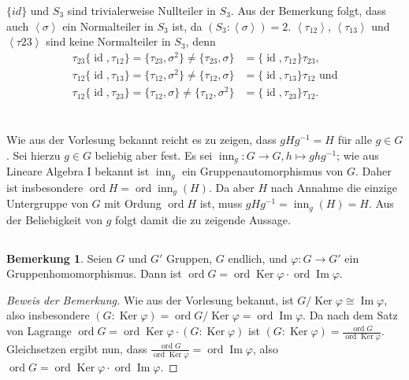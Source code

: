 \documentclass[a4paper,10pt]{article}
\theoremstyle{definition}
\newtheorem*{bem}{Bemerkung}
\newcommand{\id}{\operatorname{id}}
\newcommand{\ord}{\operatorname{ord}}
\newcommand{\inn}{\operatorname{inn}}
\newcommand{\Img}{\operatorname{Im}}
\newcommand{\Ker}{\operatorname{Ker}}
\newcommand{\gen}[1]{\left\langle#1\right\rangle}
\begin{document}
$\{id\}$ und $S_3$ sind trivialerweise Nullteiler in $S_3$. Aus der Bemerkung folgt, dass auch $\gen{\sigma}$ ein Normalteiler in $S_3$ ist, da $(S_3 : \gen{\sigma}) = 2$. $\gen{\tau_{12}}$, $\gen{\tau_{13}}$ und $\gen{\tau{23}}$ sind keine Normalteiler in $S_3$, denn
\begin{align*}
 \tau_{23} \{ \id, \tau_{12}\}
 = \{ \tau_{23}, \sigma^2 \}
 \neq \{ \tau_{23}, \sigma \}
 &= \{\id, \tau_{12}\} \tau_{23},\\
 \tau_{12} \{ \id, \tau_{13}\}
 = \{ \tau_{12}, \sigma^2 \}
 \neq \{ \tau_{12}, \sigma \}
 &= \{ \id, \tau_{13} \} \tau_{12} \text{ und}\\
 \tau_{12} \{ \id, \tau_{23} \}
 = \{ \tau_{12}, \sigma \}
 \neq  \{ \tau_{12}, \sigma^2 \}
 &= \{ \id, \tau_{23} \} \tau_{12}.
\end{align*}





\section{}







\section{}


\subsection{}
Wie aus der Vorlesung bekannt reicht es zu zeigen, dass $gHg^{-1} = H$ für alle $g \in G$. Sei hierzu $g \in G$ beliebig aber fest. Es sei $\inn_g : G \rightarrow G, h \mapsto ghg^{-1}$; wie aus Lineare Algebra I bekannt ist $\inn_g$ ein Gruppenautomorphismus von $G$. Daher ist insbesondere $\ord H = \ord \inn_g(H)$. Da aber $H$ nach Annahme die einzige Untergruppe von $G$ mit Ordung $\ord H$ ist, muss $gHg^{-1} = \inn_g(H) = H$. Aus der Beliebigkeit von $g$ folgt damit die zu zeigende Aussage.


\subsection{}
\begin{bem}
 Seien $G$ und $G'$ Gruppen, $G$ endlich, und $\varphi : G \rightarrow G'$ ein Gruppenhomomorphismus. Dann ist $\ord G = \ord \Ker \varphi \cdot \ord \Img \varphi$.
\end{bem}
\begin{proof}[Beweis der Bemerkung]
 Wie aus der Vorlesung bekannt, ist $G/\Ker \varphi \cong \Img \varphi$, also insbesondere $(G : \Ker \varphi) = \ord G/\Ker \varphi = \ord \Img \varphi$. Da nach dem Satz von Lagrange $\ord G = \ord \Ker \varphi \cdot (G : \Ker \varphi)$ ist $(G : \Ker \varphi) = \frac{\ord G}{\ord \Ker \varphi}$. Gleichsetzen ergibt nun, dass $\frac{\ord G}{\ord \Ker \varphi} = \ord \Img \varphi$, also $\ord G = \ord \Ker \varphi \cdot \ord \Img \varphi$.
\end{proof}
\end{document}

